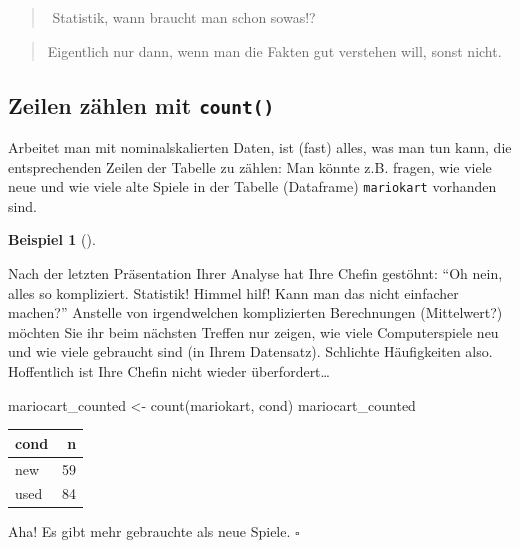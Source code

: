 \documentclass[
  letterpaper,
]{scrbook}
\newenvironment{Shaded}{\begin{snugshade}}{\end{snugshade}}
\newcommand{\FunctionTok}[1]{\textcolor[rgb]{0.28,0.35,0.67}{#1}}
\newcommand{\NormalTok}[1]{\textcolor[rgb]{0.00,0.23,0.31}{#1}}
\newcommand{\OtherTok}[1]{\textcolor[rgb]{0.00,0.23,0.31}{#1}}
\theoremstyle{definition}
\theoremstyle{definition}
\newtheorem{example}{Beispiel}[chapter]
\theoremstyle{definition}
\theoremstyle{remark}
\begin{document}
\begin{quote}
{}️ Statistik, wann braucht man schon sowas!?
\end{quote}

\begin{quote}
{} Eigentlich nur dann, wenn man die Fakten gut verstehen
will, sonst nicht.
\end{quote}

\subsection{\texorpdfstring{Zeilen zählen mit
\texttt{count()}}{Zeilen zählen mit count()}}\label{zeilen-zuxe4hlen-mit-count}

Arbeitet man mit nominalskalierten Daten, ist (fast) alles, was man tun
kann, die entsprechenden Zeilen der Tabelle zu zählen: Man könnte z.B.
fragen, wie viele neue und wie viele alte Spiele in der Tabelle
(Dataframe) \texttt{mariokart} vorhanden sind.

\begin{example}[]\protect\hypertarget{exm-count}{}\label{exm-count}

Nach der letzten Präsentation Ihrer Analyse hat Ihre Chefin gestöhnt:
\enquote{Oh nein, alles so kompliziert. Statistik! Himmel hilf! Kann man
das nicht einfacher machen?} Anstelle von irgendwelchen komplizierten
Berechnungen (Mittelwert?) möchten Sie ihr beim nächsten Treffen nur
zeigen, wie viele Computerspiele neu und wie viele gebraucht sind (in
Ihrem Datensatz). Schlichte Häufigkeiten also. Hoffentlich ist Ihre
Chefin nicht wieder überfordert\ldots{}

\begin{Shaded}
\begin{Highlighting}[]
\NormalTok{mariocart\_counted }\OtherTok{\textless{}{-}} \FunctionTok{count}\NormalTok{(mariokart, cond)}
\NormalTok{mariocart\_counted}
\end{Highlighting}
\end{Shaded}

\begin{longtable}[]{@{}lr@{}}
\toprule\noalign{}
cond & n \\
\midrule\noalign{}
\endhead
\bottomrule\noalign{}
\endlastfoot
new & 59 \\
used & 84 \\
\end{longtable}

Aha! Es gibt mehr gebrauchte als neue Spiele. \(\square\)

\end{example}
\end{document}
